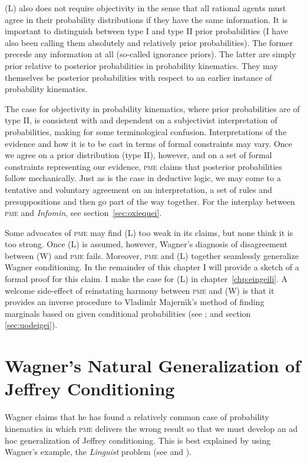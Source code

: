 \documentclass[phd,12pt,oneside]{ubcthesis}
\begin{document}
(L) also does not require objectivity in the sense that all rational
agents must agree in their probability distributions if they have the
same information. It is important to distinguish between type I and
type II prior probabilities (I have also been calling them absolutely
and relatively prior probabilities). The former precede any
information at all (so-called ignorance priors). The latter are simply
prior relative to posterior probabilities in probability kinematics.
They may themselves be posterior probabilities with respect to an
earlier instance of probability kinematics.

The case for objectivity in probability kinematics, where prior
probabilities are of type II, is consistent with and dependent on a
subjectivist interpretation of probabilities, making for some
terminological confusion. Interpretations of the evidence and how it
is to be cast in terms of formal constraints may vary. Once we agree
on a prior distribution (type II), however, and on a set of formal
constraints representing our evidence, \textsc{pme} claims that
posterior probabilities follow mechanically. Just as is the case in
deductive logic, we may come to a tentative and voluntary agreement on
an interpretation, a set of rules and presuppositions and then go part
of the way together. For the interplay between \textsc{pme} and
\emph{Infomin}, see section~\ref{sec:oxiequei}.

Some advocates of \textsc{pme} may find (L) too weak in its claims,
but none think it is too strong. Once (L) is assumed, however,
Wagner's diagnosis of disagreement between (W) and \textsc{pme} fails.
Moreover, \textsc{pme} and (L) together seamlessly generalize Wagner
conditioning. In the remainder of this chapter I will provide a sketch
of a formal proof for this claim. I make the case for (L) in
chapter~\ref{chp:eingeili}. A welcome side-effect of reinstating
harmony between \textsc{pme} and (W) is that it provides an inverse
procedure to Vladim{\'\i}r Majern{\'\i}k's method of finding marginals
based on given conditional probabilities (see ;
and section \ref{sec:uodeigei}).

\section{Wagner's Natural Generalization of Jeffrey Conditioning}
\label{sec:feeriesh}

Wagner claims that he has found a relatively common case of
probability kinematics in which \textsc{pme} delivers the wrong result
so that we must develop an ad hoc generalization of Jeffrey
conditioning. This is best explained by using Wagner's example, the
\emph{Linguist} problem (see  and
).
\end{document}
